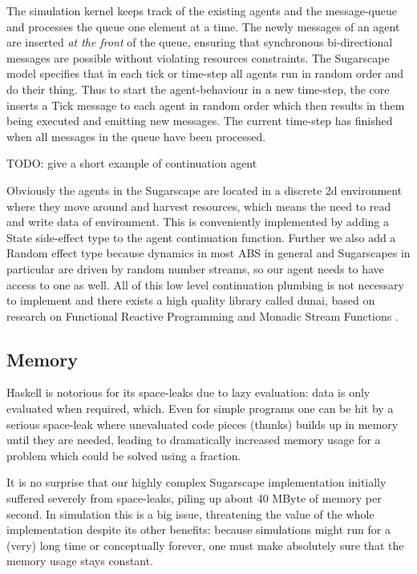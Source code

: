 The simulation kernel keeps track of the existing agents and the message-queue and processes the queue one element at a time. The newly messages of an agent are inserted \textit{at the front} of the queue, ensuring that synchronous bi-directional messages are possible without violating resources constraints. The Sugarscape model specifies that in each tick or time-step all agents run in random order and do their thing. Thus to start the agent-behaviour in a new time-step, the core inserts a Tick message to each agent in random order which then results in them being executed and emitting new messages. The current time-step has finished when all messages in the queue have been processed.

\begin{HaskellCode}
TODO: give a short example of continuation agent
\end{HaskellCode}

Obviously the agents in the Sugarscape are located in a discrete 2d environment where they move around and harvest resources, which means the need to read and write data of environment. This is conveniently implemented by adding a State side-effect type to the agent continuation function. Further we also add a Random effect type because dynamics in most ABS in general and Sugarscapes in particular are driven by random number streams, so our agent needs to have access to one as well. All of this low level continuation plumbing is not necessary to implement and there exists a high quality library called dunai, based on research on Functional Reactive Programming  \cite{hudak_arrows_2003} and Monadic Stream Functions \cite{perez_functional_2016,perez_extensible_2017}.

\subsection{Memory}
Haskell is notorious for its space-leaks due to lazy evaluation: data is only evaluated when required, which. Even for simple programs one can be hit by a serious space-leak where unevaluated code pieces (thunks) builds up in memory until they are needed, leading to dramatically increased memory usage for a problem which could be solved using a fraction.

It is no surprise that our highly complex Sugarscape implementation initially suffered severely from space-leaks, piling up about 40 MByte of memory per second. In simulation this is a big issue, threatening the value of the whole implementation despite its other benefits: because simulations might run for a (very) long time or conceptually forever, one must make absolutely sure that the memory usage stays constant.

